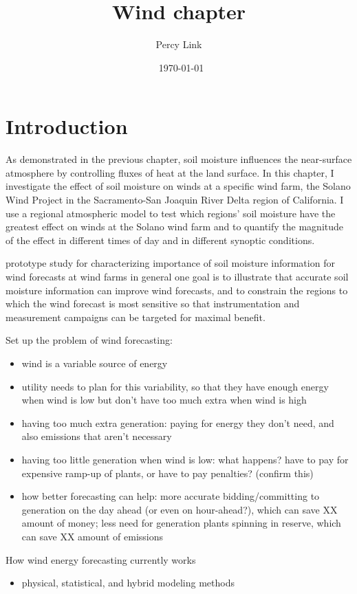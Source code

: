 \documentclass[12pt]{amsart}
\title{Wind chapter}
\author{Percy Link}
\date{\currenttime \ \today} %
\begin{document}
\maketitle

\section{Introduction}

As demonstrated in the previous chapter, soil moisture influences the near-surface atmosphere by controlling fluxes of heat at the land surface.  In this chapter, I investigate the effect of soil moisture on winds at a specific wind farm, the Solano Wind Project in the Sacramento-San Joaquin River Delta region of California.  I use a regional atmospheric model to test which regions' soil moisture have the greatest effect on winds at the Solano wind farm and to quantify the magnitude of the effect in different times of day and in different synoptic conditions.

prototype study for characterizing importance of soil moisture information for wind forecasts at wind farms in general
one goal is to illustrate that accurate soil moisture information can improve wind forecasts, and to constrain the regions to which the wind forecast is most sensitive so that instrumentation and measurement campaigns can be targeted for maximal benefit.

Set up the problem of wind forecasting:
\begin{itemize}
\item wind is a variable source of energy
\item utility needs to plan for this variability, so that they have enough energy when wind is low but don't have too much extra when wind is high
\item having too much extra generation: paying for energy they don't need, and also emissions that aren't necessary
\item having too little generation when wind is low: what happens?  have to pay for expensive ramp-up of plants, or have to pay penalties?  (confirm this)
\item how better forecasting can help: more accurate bidding/committing to generation on the day ahead (or even on hour-ahead?), which can save XX amount of money; less need for generation plants spinning in reserve, which can save XX amount of emissions
\end{itemize}

How wind energy forecasting currently works
\begin{itemize}
\item physical, statistical, and hybrid modeling methods
\end{itemize}
\end{document}
